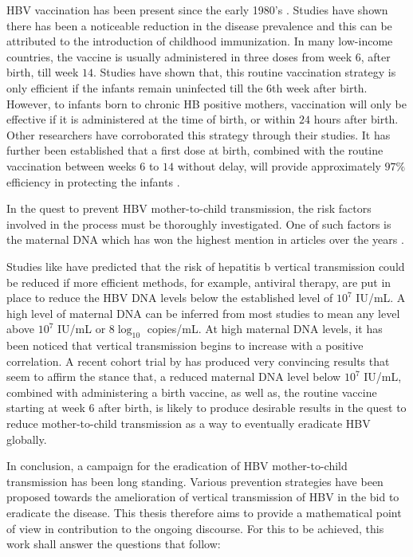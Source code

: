HBV vaccination has been present since the early 1980's \cite{tharmaphornpilas2009increasedRisk}. Studies have shown there has been a noticeable reduction in the disease prevalence and this can be attributed to the introduction of childhood immunization. In many low-income countries, the vaccine is usually administered in three doses from week $6$, after birth, till week $14$. Studies have shown that, this routine vaccination strategy is only efficient if the infants remain uninfected till the $6$th week after birth. However, to infants born to chronic HB positive mothers, vaccination will only be effective if it is administered at the time of birth, or within $24$ hours after birth. Other researchers have corroborated this strategy through their studies. It has further been established that a first dose at birth, combined with the routine vaccination between weeks $6$ to $14$ without delay, will provide approximately $97\%$ efficiency in protecting the infants \cite{tharmaphornpilas2009increasedRisk,tran2009management}.

In the quest to prevent HBV mother-to-child transmission, the risk factors involved in the process must be thoroughly investigated. One of such factors is the maternal DNA which has won the highest mention in articles over the years \cite{tran2009management,Pan2012}. 

Studies like \cite{tran2009management,thio2015global} have predicted that the risk of hepatitis b vertical transmission could be reduced if more efficient methods, for example, antiviral therapy, are put in place to reduce the HBV DNA levels below the established level of $10^7$ IU/mL. A high level of maternal DNA can be inferred from most studies to mean any level above $10^7$ IU/mL or $8\log_{10}$ copies/mL. At high maternal DNA levels, it has been noticed that vertical transmission begins to increase with a positive correlation. A recent cohort trial by \cite{pan2016TenofivirToPrevent} has produced very convincing results that seem to affirm the stance that, a reduced maternal DNA level below $10^7$ IU/mL, combined with administering a birth vaccine, as well as, the routine vaccine starting at week 6 after birth, is likely to produce desirable results in the quest to reduce mother-to-child transmission as a way to eventually eradicate HBV globally. 

In conclusion,  a campaign for the eradication of HBV mother-to-child transmission has been long standing. Various prevention strategies have been proposed towards the amelioration of vertical transmission of HBV in the bid to eradicate the disease. This thesis therefore aims to provide a mathematical point of view in contribution to the ongoing discourse. For this to be achieved, this work shall answer the questions that follow:

